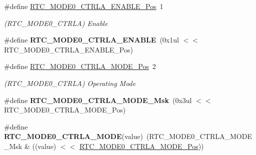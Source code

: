 \begin{DoxyCompactItemize}
\item 
\hypertarget{group___s_a_m_l21___r_t_c_ga33b044a02ed19327628ab16cc315b13a}{}\#define \hyperlink{group___s_a_m_l21___r_t_c_ga33b044a02ed19327628ab16cc315b13a}{R\+T\+C\+\_\+\+M\+O\+D\+E0\+\_\+\+C\+T\+R\+L\+A\+\_\+\+E\+N\+A\+B\+L\+E\+\_\+\+Pos}~1\label{group___s_a_m_l21___r_t_c_ga33b044a02ed19327628ab16cc315b13a}

\begin{DoxyCompactList}\small\item\em (R\+T\+C\+\_\+\+M\+O\+D\+E0\+\_\+\+C\+T\+R\+L\+A) Enable \end{DoxyCompactList}\item 
\hypertarget{group___s_a_m_l21___r_t_c_ga18321ba8866f43d06310d7454142d2b2}{}\#define {\bfseries R\+T\+C\+\_\+\+M\+O\+D\+E0\+\_\+\+C\+T\+R\+L\+A\+\_\+\+E\+N\+A\+B\+L\+E}~(0x1ul $<$$<$ R\+T\+C\+\_\+\+M\+O\+D\+E0\+\_\+\+C\+T\+R\+L\+A\+\_\+\+E\+N\+A\+B\+L\+E\+\_\+\+Pos)\label{group___s_a_m_l21___r_t_c_ga18321ba8866f43d06310d7454142d2b2}

\item 
\hypertarget{group___s_a_m_l21___r_t_c_ga2f001f07dca26979505852573f1bb701}{}\#define \hyperlink{group___s_a_m_l21___r_t_c_ga2f001f07dca26979505852573f1bb701}{R\+T\+C\+\_\+\+M\+O\+D\+E0\+\_\+\+C\+T\+R\+L\+A\+\_\+\+M\+O\+D\+E\+\_\+\+Pos}~2\label{group___s_a_m_l21___r_t_c_ga2f001f07dca26979505852573f1bb701}

\begin{DoxyCompactList}\small\item\em (R\+T\+C\+\_\+\+M\+O\+D\+E0\+\_\+\+C\+T\+R\+L\+A) Operating Mode \end{DoxyCompactList}\item 
\hypertarget{group___s_a_m_l21___r_t_c_gab44578de1eebd49e66b157670fca44dd}{}\#define {\bfseries R\+T\+C\+\_\+\+M\+O\+D\+E0\+\_\+\+C\+T\+R\+L\+A\+\_\+\+M\+O\+D\+E\+\_\+\+Msk}~(0x3ul $<$$<$ R\+T\+C\+\_\+\+M\+O\+D\+E0\+\_\+\+C\+T\+R\+L\+A\+\_\+\+M\+O\+D\+E\+\_\+\+Pos)\label{group___s_a_m_l21___r_t_c_gab44578de1eebd49e66b157670fca44dd}

\item 
\hypertarget{group___s_a_m_l21___r_t_c_gaefc7f687575d286120944102a0b59950}{}\#define {\bfseries R\+T\+C\+\_\+\+M\+O\+D\+E0\+\_\+\+C\+T\+R\+L\+A\+\_\+\+M\+O\+D\+E}(value)~(R\+T\+C\+\_\+\+M\+O\+D\+E0\+\_\+\+C\+T\+R\+L\+A\+\_\+\+M\+O\+D\+E\+\_\+\+Msk \& ((value) $<$$<$ \hyperlink{group___s_a_m_l21___r_t_c_ga2f001f07dca26979505852573f1bb701}{R\+T\+C\+\_\+\+M\+O\+D\+E0\+\_\+\+C\+T\+R\+L\+A\+\_\+\+M\+O\+D\+E\+\_\+\+Pos}))\label{group___s_a_m_l21___r_t_c_gaefc7f687575d286120944102a0b59950}


\end{DoxyCompactItemize}
